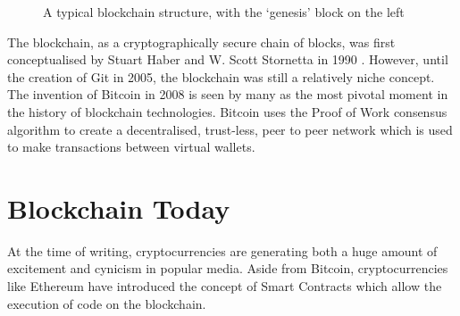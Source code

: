 \documentclass[12pt,a4paper,twoside,openright]{report}
\begin{document}
	\begin{figure}
		\begin{center}
			\end{center}
		\caption{A typical blockchain structure, with the `genesis' block on the left}
		\label{fig:mainblockchain}
	\end{figure}
	The blockchain, as a cryptographically secure chain of blocks, was first conceptualised by Stuart Haber and W. Scott Stornetta in 1990 \cite{HaberStornetta}.
	However, until the creation of Git \cite{Git} in 2005, the blockchain was still a relatively niche concept.
	The invention of Bitcoin in 2008 is seen by many as the most pivotal moment in the history of blockchain technologies.
	Bitcoin uses the Proof of Work consensus algorithm to create a decentralised, trust-less, peer to peer network which is used to make transactions between virtual wallets.

	\section{Blockchain Today}
	At the time of writing, cryptocurrencies are generating both a huge amount of excitement and cynicism in popular media. 
	Aside from Bitcoin, cryptocurrencies like Ethereum \cite{Ethereum} have introduced the concept of Smart Contracts which allow the execution of code on the blockchain.\\
	
\end{document}
